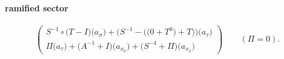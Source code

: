 \paragraph{ramified sector}
\[\begin{pmatrix}S^{-1}\circ \bigl(T-I\bigr)\bigl(a_{\sigma}\bigr)+\bigl(S^{-1}-\bigl(\bigl(0+T^{0}\bigr)+T\bigr)\bigr)\bigl(a_{\tau}\bigr)\\\Pi\bigl(a_{\tau}\bigr)+\bigl(A^{-1}+I\bigr)\bigl(a_{x_{0}}\bigr)+\bigl(S^{-4}+\Pi\bigr)\bigl(a_{x_{2}}\bigr)\end{pmatrix}\qquad(\Pi=0).\]
